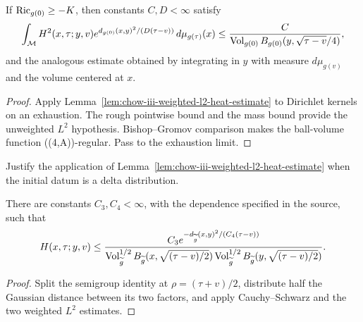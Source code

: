 \begin{lemma}
\label{lem:chow-iii-heat-kernel-average-gaussian-decay}


If \(\operatorname{Ric}_{g(0)}\ge-K\), then constants \(C,D<\infty\) satisfy
\[
 \int_{\mathcal M}H^2(x,\tau;y,v)
 e^{d_{g(0)}(x,y)^2/(D(\tau-v))}\,d\mu_{g(\tau)}(x)
 \le\frac{C}{\operatorname{Vol}_{g(0)}B_{g(0)}(y,\sqrt{\tau-v}/4)},
\]
and the analogous estimate obtained by integrating in \(y\) with measure
\(d\mu_{g(v)}\) and the volume centered at \(x\).
\end{lemma}
\begin{proof}
\sketch Apply Lemma~\ref{lem:chow-iii-weighted-l2-heat-estimate} to Dirichlet kernels
on an exhaustion.  The rough pointwise bound and the mass bound provide the
unweighted \(L^2\) hypothesis.  Bishop--Gromov comparison makes the ball-volume
function ((4,A))-regular.  Pass to the exhaustion limit.
\end{proof}

\begin{claim}
\label{clm:chow-iii-weighted-l2-delta-source-exercise}


Justify the application of Lemma~\ref{lem:chow-iii-weighted-l2-heat-estimate}
when the initial datum is a delta distribution.
\end{claim}

\begin{theorem}
\label{thm:chow-iii-evolving-heat-kernel-gaussian-upper-bound}


There are constants \(C_3,C_4<\infty\), with the dependence specified in the
source, such that
\[
 H(x,\tau;y,v)\le
 \frac{C_3e^{-d_{\widetilde g}(x,y)^2/(C_4(\tau-v))}}
 {\operatorname{Vol}_{\widetilde g}^{1/2}B_{\widetilde g}(x,\sqrt{(\tau-v)/2})
  \operatorname{Vol}_{\widetilde g}^{1/2}B_{\widetilde g}(y,\sqrt{(\tau-v)/2})}.
\]
\end{theorem}
\begin{proof}
\sketch Split the semigroup identity at \(\rho=(\tau+v)/2\), distribute half the
Gaussian distance between its two factors, and apply Cauchy--Schwarz and the
two weighted \(L^2\) estimates.
\end{proof}

